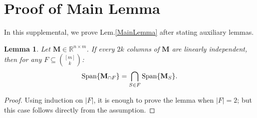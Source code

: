\documentclass[9pt,twocolumn]{pnas-new}
\newtheorem{lemma}{Lemma}
\newtheorem{remark}{Remark}
\begin{document}



\clearpage

\section{Proof of Main Lemma}

In this supplemental, we prove Lem.\ref{MainLemma} after stating auxiliary lemmas.

\begin{lemma}\label{SpanIntersectionLemma}
Let $\mathbf{M} \in \mathbb{R}^{n \times m}$. If every $2k$ columns of $\mathbf{M}$ are linearly independent, then for any $F \subseteq {[m] \choose k}$:
\begin{align*}
\text{\rm Span}\{\mathbf{M}_{\cap F}\}  = \bigcap_{S \in F} \text{\rm Span}\{\mathbf{M}_S\}.
\end{align*}
\end{lemma}
\begin{proof}
Using induction on $|F|$, it is enough to prove the lemma when $|F| = 2$; but this case follows directly from the assumption.
\end{proof}
\end{document}
